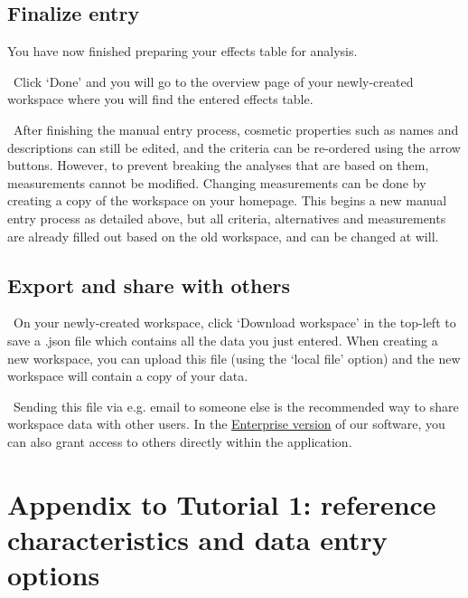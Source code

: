 \documentclass[00_mcda_tutorial.tex]{subfiles}
\begin{document}
\subsection*{Finalize entry}
You have now finished preparing your effects table for analysis.
\newline

\noindent \leftpointright \, Click ‘Done’ and you will go to the overview page of your newly-created workspace where you will find the entered effects table.
\newline

\noindent \faGraduationCap \, After finishing the manual entry process, cosmetic properties such as names and descriptions can still be edited, and the criteria can be re-ordered using the arrow buttons. However, to prevent breaking the analyses that are based on them, measurements cannot be modified. Changing measurements can be done by creating a copy of the workspace on your homepage. This begins a new manual entry process as detailed above, but all criteria, alternatives and measurements are already filled out based on the old workspace, and can be changed at will.

\subsection*{Export and share with others}
\noindent \leftpointright \, On your newly-created workspace, click ‘Download workspace’ in the top-left to save a .json file which contains all the data you just entered. When creating a new workspace, you can upload this file (using the ‘local file’ option) and the new workspace will contain a copy of your data.
\newline

\noindent \faLightbulbO \, Sending this file via e.g. email to someone else is the recommended way to share workspace data with other users. In the \href{http://drugis.org/services/index}{Enterprise version} of our software, you can also grant access to others directly within the application.
\clearpage




\section*{Appendix to Tutorial 1: reference characteristics and data entry options}
\label{appendix1}
\end{document}
